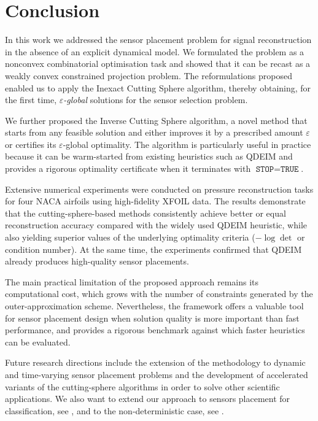 \documentclass[12pt]{amsart}
\theoremstyle{plain}
\theoremstyle{definition}
\begin{document}
	\section{Conclusion}

In this work we addressed the sensor placement problem for signal reconstruction in the absence of an explicit dynamical model. We formulated the problem as a nonconvex combinatorial optimisation task and showed that it can be recast as a weakly convex constrained projection problem. The reformulations proposed enabled us to apply the Inexact Cutting Sphere algorithm, thereby obtaining, for the first time, \emph{$\varepsilon$-global} solutions for the sensor selection problem.

We further proposed the Inverse Cutting Sphere algorithm, a novel method that starts from any feasible solution and either improves it by a prescribed amount $\varepsilon$ or certifies its $\varepsilon$-global optimality. The algorithm is particularly useful in practice because it can be warm-started from existing heuristics such as QDEIM and provides a rigorous optimality certificate when it terminates with $\texttt{STOP}=\texttt{TRUE}$.

Extensive numerical experiments were conducted on pressure reconstruction tasks for four NACA airfoils using high-fidelity XFOIL data. The results demonstrate that the cutting-sphere-based methods consistently achieve better or equal reconstruction accuracy compared with the widely used QDEIM heuristic, while also yielding superior values of the underlying optimality criteria ($-\log\det$ or condition number). At the same time, the experiments confirmed that QDEIM already produces high-quality sensor placements.

The main practical limitation of the proposed approach remains its computational cost, which grows with the number of constraints generated by the outer-approximation scheme. Nevertheless, the framework offers a valuable tool for sensor placement design when solution quality is more important than fast performance, and provides a rigorous benchmark against which faster heuristics can be evaluated.

Future research directions include the extension of the methodology to dynamic and time-varying sensor placement problems and the development of accelerated variants of the cutting-sphere algorithms in order to solve other scientific applications. We also want to extend our approach to sensors placement for classification, see \cite{BruntonClass}, and to the non-deterministic case, see \cite{kakasenko2026bridging}.




	
		
		
\end{document}
